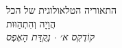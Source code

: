 \documentclass[10pt, openany, oneside]{book}
\renewcommand{\normalsize}{\fontsize{10}{13}\selectfont}
\begin{document}

\thispagestyle{empty}
\vspace*{\fill}
\begin{center}
    {\normalsize\textsc{התאוריה הטלאולוגית של הכל}}\\[1.5em]
    {\fontsize{24}{28}\selectfont\textsc{הֲוָיָה וְהִתְהַוּוּת}}\\[0.8em]
    {\normalsize\textit{קוֹדֶקְס א׳ $\cdot$ נְקֻדַּת הָאֶפֶס}}
\end{center}
\vspace*{\fill}
\newpage

\end{document}
